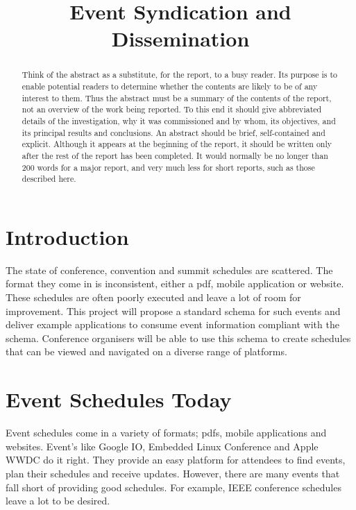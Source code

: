 \documentclass{article}
\title{Event Syndication and Dissemination}
\begin{document}


\maketitle



\begin{abstract}
Think of the abstract as a substitute, for the report, to a busy reader. Its purpose is to enable potential readers to determine whether the contents are likely to be of any interest to them. Thus the abstract must be a summary of the contents of the report, not an overview of the work being reported. To this end it should give abbreviated details of the investigation, why it was commissioned and by whom, its objectives, and its principal results and conclusions.
An abstract should be brief, self-contained and explicit. Although it appears at the beginning of the report, it should be written only after the rest of the report has been completed. It would normally be no longer than 200 words for a major report, and very much less for short reports, such as those described here.
\end{abstract}


\section{Introduction}
The state of conference, convention and summit schedules are scattered. The format they come in is inconsistent, either a pdf, mobile application or website. These schedules are often poorly executed and leave a lot of room for improvement. This project will propose a standard schema for such events and deliver example applications to consume event information compliant with the schema. Conference organisers will be able to use this schema to create schedules that can be viewed and navigated on a diverse range of platforms.

\section{Event Schedules Today}
Event schedules come in a variety of formats; pdfs, mobile applications and websites. Event's like Google IO\cite{googleIO2015}, Embedded Linux Conference\cite{embeddedlinuxconference2015} and Apple WWDC\cite{apple2014wwdc} do it right. They provide an easy platform for attendees to find events, plan their schedules and receive updates. However, there are many events that fall short of providing good schedules. For example, IEEE conference schedules \cite{ieeeIMC2014,ieeePSC2015,ieeeICC2014} leave a lot to be desired.
\end{document}
